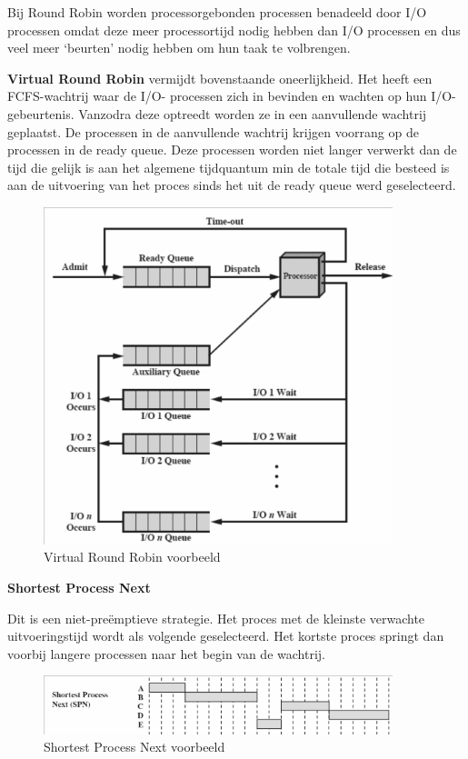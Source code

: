 Bij Round Robin worden processorgebonden processen benadeeld door I/O processen omdat deze meer processortijd nodig hebben dan I/O processen en dus veel meer ‘beurten’ nodig hebben om hun taak te volbrengen.

\textbf{Virtual Round Robin} vermijdt bovenstaande oneerlijkheid. Het heeft een FCFS-wachtrij waar de I/O- processen zich in bevinden en wachten op hun I/O-gebeurtenis. Vanzodra deze optreedt worden ze in een aanvullende wachtrij geplaatst. De processen in de aanvullende wachtrij krijgen voorrang op de processen in de ready queue. Deze processen worden niet langer verwerkt dan de tijd die gelijk is aan het algemene tijdquantum min de totale tijd die besteed is aan de uitvoering van het proces sinds het uit de ready queue werd geselecteerd.



\begin{figure}[htp]
    \centering
            \includegraphics[width=4in]{img/virtualroundrobin.png}
        \caption{Virtual Round Robin voorbeeld}
    \label{fig:Virtual Round Robin voorbeeld}
\end{figure}

\textbf{Shortest Process Next}

Dit is een niet-preëmptieve strategie. Het proces met de kleinste verwachte uitvoeringstijd wordt als volgende geselecteerd. Het kortste proces springt dan voorbij langere processen naar het begin van de wachtrij.

\begin{figure}[htp]
    \centering
            \includegraphics[width=4in]{img/spn.png}
        \caption{Shortest Process Next voorbeeld}
    \label{fig:Shortest Process Next voorbeeld}
\end{figure}

